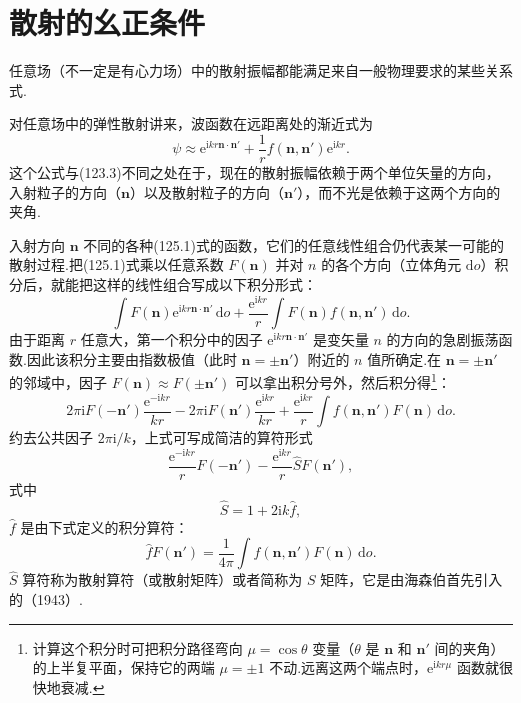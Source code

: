 \section{散射的幺正条件}

任意场（不一定是有心力场）中的散射振幅都能满足来自一般物理要求的某些关系式.

对任意场中的弹性散射讲来，波函数在远距离处的渐近式为
\begin{equation}
  \psi\approx\mathrm{e}^{\mathrm{i}kr\boldsymbol{n}\cdot\boldsymbol{n}'}
  +\frac{1}{r}f(\boldsymbol{n},\boldsymbol{n}')\mathrm{e}^{\mathrm{i}kr}.
\end{equation}
这个公式与(123.3)不同之处在于，现在的散射振幅依赖于两个单位矢量的方向，入射粒子的方向（$\boldsymbol{n}$）以及散射粒子的方向（$\boldsymbol{n}'$），而不光是依赖于这两个方向的夹角.

入射方向 $\boldsymbol{n}$ 不同的各种(125.1)式的函数，它们的任意线性组合仍代表某一可能的散射过程.把(125.1)式乘以任意系数 $F(\boldsymbol{n})$ 并对 $n$ 的各个方向（立体角元 $\mathrm{d}o$）积分后，就能把这样的线性组合写成以下积分形式：
\begin{equation}
  \int F(\boldsymbol{n})
  \mathrm{e}^{\mathrm{i}kr\boldsymbol{n}\cdot\boldsymbol{n}'}\,\mathrm{d}o
  +\frac{\mathrm{e}^{\mathrm{i}kr}}{r}
  \int F(\boldsymbol{n})f(\boldsymbol{n},\boldsymbol{n}')\,\mathrm{d}o.
\end{equation}
由于距离 $r$ 任意大，第一个积分中的因子
$\mathrm{e}^{\mathrm{i}kr\boldsymbol{n}\cdot\boldsymbol{n}'}$
是变矢量 $n$ 的方向的急剧振荡函数.因此该积分主要由指数极值（此时 $\boldsymbol{n}=\pm\boldsymbol{n}'$）附近的 $n$ 值所确定.在 $\boldsymbol{n}=\pm\boldsymbol{n}'$ 的邻域中，因子 $F(\boldsymbol{n})\approx F(\pm\boldsymbol{n}')$ 可以拿出积分号外，然后积分得\footnote{计算这个积分时可把积分路径弯向 $\mu=\cos\theta$ 变量（$\theta$ 是 $\boldsymbol{n}$ 和 $\boldsymbol{n}'$ 间的夹角）的上半复平面，保持它的两端 $\mu=\pm1$ 不动.远离这两个端点时，$\mathrm{e}^{\mathrm{i}kr\mu}$ 函数就很快地衰减.}：
\begin{equation*}
  2\pi\mathrm{i}F(-\boldsymbol{n}')\frac{\mathrm{e}^{-\mathrm{i}kr}}{kr}
  -2\pi\mathrm{i}F(\boldsymbol{n}')\frac{\mathrm{e}^{\mathrm{i}kr}}{kr}
  +\frac{\mathrm{e}^{\mathrm{i}kr}}{r}
  \int f(\boldsymbol{n},\boldsymbol{n}')F(\boldsymbol{n})\,\mathrm{d}o.
\end{equation*}
约去公共因子 $2\pi\mathrm{i}/k$，上式可写成简洁的算符形式
\begin{equation}
  \frac{\mathrm{e}^{-\mathrm{i}kr}}{r}F(-\boldsymbol{n}')
  -\frac{\mathrm{e}^{\mathrm{i}kr}}{r}\hat{S}F(\boldsymbol{n}'),
\end{equation}
式中
\begin{equation}
  \hat{S}=1+2\mathrm{i}k\hat{f},
\end{equation}
$\hat{f}$ 是由下式定义的积分算符：
\begin{equation}
  \hat{f}F(\boldsymbol{n}')=\frac{1}{4\pi}
  \int f(\boldsymbol{n},\boldsymbol{n}')F(\boldsymbol{n})\,\mathrm{d}o.
\end{equation}
$\hat{S}$ 算符称为散射算符（或散射矩阵）或者简称为 $S$ 矩阵，它是由海森伯首先引入的（1943）.


